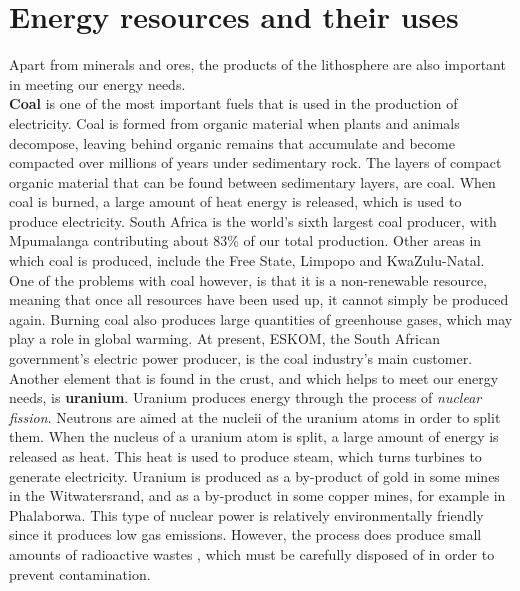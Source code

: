 



\section{Energy resources and their uses}
\label{sec:mining:energy}

Apart from minerals and ores, the products of the lithosphere are also important in meeting our energy needs.\\

\textbf{Coal} is one of the most important fuels that is used in the production of electricity. Coal is formed from organic material when plants and animals decompose, leaving behind organic remains that accumulate and become compacted over millions of years under sedimentary rock. The layers of compact organic material that can be found between sedimentary layers, are coal. When coal is burned, a large amount of heat energy is released, which is used to produce electricity. South Africa is the world's sixth largest coal producer, with Mpumalanga contributing about 83\% of our total production. Other areas in which coal is produced, include the Free State, Limpopo and KwaZulu-Natal. One of the problems with coal however, is that it is a non-renewable resource, meaning that once all resources have been used up, it cannot simply be produced again. Burning coal also produces large quantities of greenhouse gases, which may play a role in global warming. At present, ESKOM, the South African government's electric power producer, is the coal industry's main customer.\\

Another element that is found in the crust, and which helps to meet our energy needs, is \textbf{uranium}. Uranium produces energy through the process of \textit{nuclear fission}. Neutrons are aimed at the nucleii of the uranium atoms in order to split them. When the nucleus of a uranium atom is split, a large amount of energy is released as heat. This heat is used to produce steam, which turns turbines to generate electricity. Uranium is produced as a by-product of gold in some mines in the Witwatersrand, and as a by-product in some copper mines, for example in Phalaborwa. This type of nuclear power is relatively environmentally friendly since it produces low gas emissions. However, the process does produce small amounts of radioactive wastes , which must be carefully disposed of in order to prevent contamination.\\

